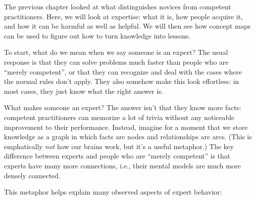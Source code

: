 
The previous chapter looked at what distinguishes novices from
competent practitioners.  Here, we will look at expertise: what it is,
how people acquire it, and how it can be harmful as well as helpful.
We will then see how concept maps can be used to figure out how to
turn knowledge into lessons.

To start, what do we mean when we say someone is an expert?  The usual
response is that they can solve problems much faster than people who
are ``merely competent'', or that they can recognize and deal with the
cases where the normal rules don't apply.  They also somehow make this
look effortless: in most cases, they just know what the right answer
is.

What makes someone an expert? The answer isn't that they know more
facts: competent practitioners can memorize a lot of trivia without
any noticeable improvement to their performance.  Instead, imagine for
a moment that we store knowledge as a graph in which facts are nodes
and relationships are arcs. (This is emphatically \emph{not} how our
brains work, but it's a useful metaphor.) The key difference between
experts and people who are ``merely competent'' is that experts have
many more connections, i.e., their mental models are much more densely
connected.

This metaphor helps explain many observed aspects of expert behavior:

